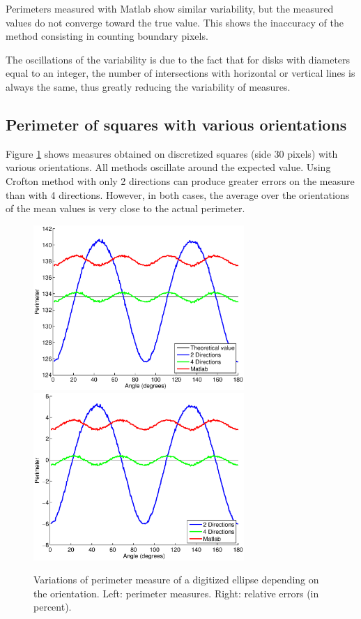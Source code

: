 \documentclass{InsightArticle}
\begin{document}
Perimeters measured with Matlab show similar variability, but the measured values do not
converge toward the true value. This shows the inaccuracy of the method consisting in
counting boundary pixels.

The oscillations of the variability is due to the fact that for disks with diameters equal to an
integer, the number of intersections with horizontal or vertical lines is always the same, 
thus greatly reducing the variability of measures. 

\subsection{Perimeter of squares with various orientations}

Figure \ref{fig:MeasureSquareOriented} shows measures obtained on discretized squares (side 30 pixels)
with various orientations. All methods oscillate around the expected value. 
Using Crofton method with only 2 directions can produce greater errors on the measure than with 4 
directions. However, in both cases, the average over the orientations of the mean values is very close 
to the actual perimeter.

\begin{figure}[!htb]
\begin{center}
\includegraphics[width=8cm]{images/perimRotatedEllipses}
\includegraphics[width=8cm]{images/errorRotatedEllipses}
\end{center}
\caption{Variations of perimeter measure of a digitized ellipse depending on the orientation. 
Left: perimeter measures. Right: relative errors (in percent).}
\label{fig:MeasureSquareOriented}
\end{figure}
\end{document}

